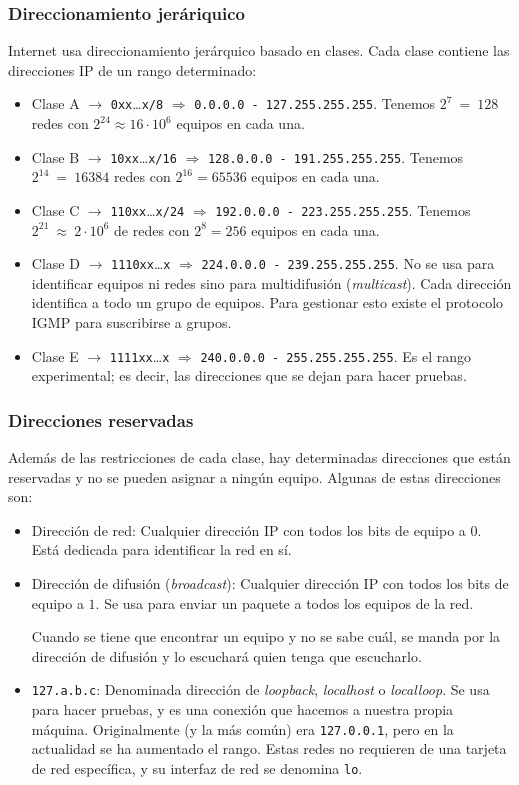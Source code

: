 \subsubsection{Direccionamiento jeráriquico}
\noindent
Internet usa direccionamiento jerárquico basado en clases. Cada clase contiene las direcciones IP de un rango determinado:
\begin{itemize}
    \item Clase A $\rightarrow$ \verb|0xx|\ldots\verb|x/8| $\Longrightarrow $ \verb|0.0.0.0 - 127.255.255.255|. Tenemos $2^7~=~128$ redes con $2^{24} \approx 16\cdot 10^6$ equipos en cada una. 
    \item Clase B $\rightarrow$ \verb|10xx|\ldots\verb|x/16| $\Longrightarrow $ \verb|128.0.0.0 - 191.255.255.255|. Tenemos $2^{14}~=~16384$ redes con $2^{16}=65536$ equipos en cada una. 
    \item Clase C $\rightarrow$ \verb|110xx|\ldots\verb|x/24| $\Longrightarrow $ \verb|192.0.0.0 - 223.255.255.255|. Tenemos $2^{21}~\approx~2\cdot 10^6$ de redes con $2^{8} = 256$ equipos en cada una. 
    \item Clase D $\rightarrow$ \verb|1110xx|\ldots\verb|x| $\Longrightarrow$ \verb|224.0.0.0 - 239.255.255.255|. No se usa para identificar equipos ni redes sino para multidifusión (\textit{multicast}). Cada dirección identifica a todo un grupo de equipos. Para gestionar esto existe el protocolo \acrshort{IGMP} para suscribirse a grupos.
    \item Clase E $\rightarrow$ \verb|1111xx|\ldots\verb|x| $\Longrightarrow $ \verb|240.0.0.0 - 255.255.255.255|. Es el rango experimental; es decir, las direcciones que se dejan para hacer pruebas. 
\end{itemize}

\subsubsection{Direcciones reservadas}
Además de las restricciones de cada clase, hay determinadas direcciones que están reservadas y no se pueden asignar a ningún equipo. Algunas de estas direcciones son:
\begin{itemize}
    \item Dirección de red: Cualquier dirección IP con todos los bits de equipo a $0$. Está dedicada para identificar la red en sí.
    \item Dirección de difusión (\textit{broadcast}): Cualquier dirección IP con todos los bits de equipo a $1$. Se usa para enviar un paquete a todos los equipos de la red.
    
    Cuando se tiene que encontrar un equipo y no se sabe cuál, se manda por la dirección de difusión y lo escuchará quien tenga que escucharlo.

    \item \verb|127.a.b.c|: Denominada dirección de \textit{loopback}, \textit{localhost} o \textit{localloop}. Se usa para hacer pruebas, y es una conexión que hacemos a nuestra propia máquina. Originalmente (y la más común) era \verb|127.0.0.1|, pero en la actualidad se ha aumentado el rango.
    Estas redes no requieren de una tarjeta de red específica, y su interfaz de red se denomina \verb|lo|.
\end{itemize}

